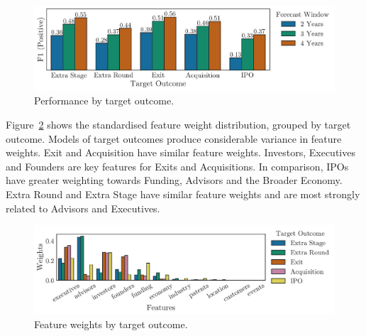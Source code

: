 \documentclass[../thesis/thesis.tex]{subfiles}
\begin{document}
\begin{figure}[!htb]
    \centering
    \includegraphics[width=\textwidth]{../figures/evaluation/performance_outcome}
    \caption[Performance by target outcome]{Performance by target outcome.}
    \label{fig:evaluation:f1_predictive_outcome}
\end{figure}

Figure~\ref{fig:evaluation:features_outcome} shows the standardised feature weight distribution, grouped by target outcome. Models of target outcomes produce considerable variance in feature weights. Exit and Acquisition have similar feature weights. Investors, Executives and Founders are key features for Exits and Acquisitions. In comparison, IPOs have greater weighting towards Funding, Advisors and the Broader Economy. Extra Round and Extra Stage have similar feature weights and are most strongly related to Advisors and Executives.

\begin{figure}[!htb]
    \centering
    \includegraphics[width=\textwidth]{../figures/evaluation/features_outcome}
    \caption[Feature weights by target outcome]{Feature weights by target outcome.}
    \label{fig:evaluation:features_outcome}
\end{figure}

\end{document}
